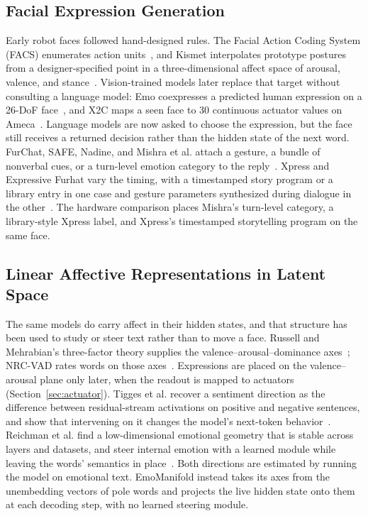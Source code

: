 \documentclass[letterpaper, 10 pt, conference]{ieeeconf/ieeeconf}
\begin{document}
\subsection{Facial Expression Generation}
Early robot faces followed hand-designed rules. The Facial Action Coding System (FACS) enumerates action units~\cite{ekman1978facs}, and Kismet interpolates prototype postures from a designer-specified point in a three-dimensional affect space of arousal, valence, and stance~\cite{breazeal2002designing}. Vision-trained models later replace that target without consulting a language model: Emo coexpresses a predicted human expression on a 26-DoF face~\cite{hu2024emo}, and X2C maps a seen face to 30 continuous actuator values on Ameca~\cite{li2025x2c}. Language models are now asked to choose the expression, but the face still receives a returned decision rather than the hidden state of the next word. FurChat, SAFE, Nadine, and Mishra et al. attach a gesture, a bundle of nonverbal cues, or a turn-level emotion category to the reply~\cite{cherakara2023furchat,lee2023safe,kang2024nadine,mishra2023realtime}. Xpress and Expressive Furhat vary the timing, with a timestamped story program or a library entry in one case and gesture parameters synthesized during dialogue in the other~\cite{antony2025xpress,abbo2025expressive}. The hardware comparison places Mishra's turn-level category, a library-style Xpress label, and Xpress's timestamped storytelling program on the same face.

\subsection{Linear Affective Representations in Latent Space}
The same models do carry affect in their hidden states, and that structure has been used to study or steer text rather than to move a face. Russell and Mehrabian's three-factor theory supplies the valence--arousal--dominance axes~\cite{russell1977evidence}; NRC-VAD rates words on those axes~\cite{mohammad2018nrcvad}. Expressions are placed on the valence--arousal plane only later, when the readout is mapped to actuators (Section~\ref{sec:actuator}). Tigges et al. recover a sentiment direction as the difference between residual-stream activations on positive and negative sentences, and show that intervening on it changes the model's next-token behavior~\cite{tigges2024sentiment}. Reichman et al. find a low-dimensional emotional geometry that is stable across layers and datasets, and steer internal emotion with a learned module while leaving the words' semantics in place~\cite{reichman2026emotions}. Both directions are estimated by running the model on emotional text. EmoManifold instead takes its axes from the unembedding vectors of pole words and projects the live hidden state onto them at each decoding step, with no learned steering module.
\end{document}
